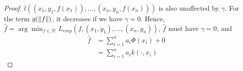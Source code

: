 \documentclass[twoside]{memoir}
\begin{document}
\begin{proof}
		$l((x_1, y_1, f(x_1)), ..., (x_n, y_n, f(x_n)))$ is also unaffected by $\gamma$. For the term $g(\lVert f\rVert)$, it decreases if we have $\gamma = 0$. Hence,  $\hat{f} = \arg \min_{f \in \mathcal{H}} L_{emp}(f, (x_1, y_1), ..., (x_n, y_n))$, $\hat{f}$ must have $\gamma = 0$, and 
		\begin{equation*}
		\begin{split}
		\hat{f} &= \sum_{i=1}^{n} a_i \Phi(x_i) + 0 \\
		&=  \sum_{i=1}^{n} a_i k(\cdot, x_i)
		\end{split}
		\end{equation*}
	\end{proof}


%
\end{document}
